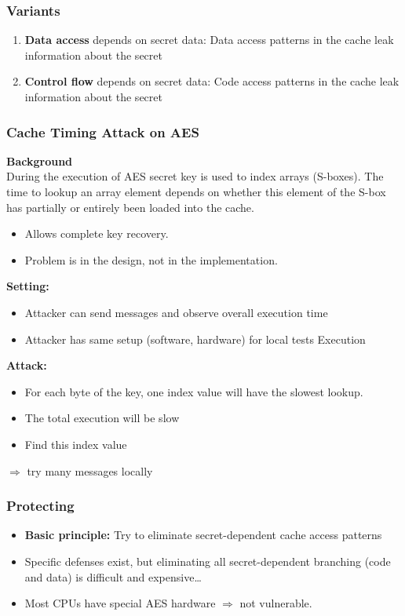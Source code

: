 \subsubsection{Variants}
\begin{enumerate}
  \item \textbf{Data access} depends on secret data: Data access patterns
    in the cache leak information about the secret
  \item \textbf{Control flow} depends on secret data: Code access
    patterns in the cache leak information about the secret
\end{enumerate}
\subsubsection{Cache Timing Attack on AES}
\textbf{Background}\\
During the execution of AES secret key is used to
index arrays (S-boxes). The time to lookup an array element depends
on whether this element of the S-box has partially or entirely been loaded into the
cache.
\begin{itemize}
  \item Allows complete key recovery.
  \item Problem is in the design, not in the implementation.
\end{itemize}

\textbf{Setting:}
\begin{itemize}
  \item Attacker can send messages and observe overall execution time
  \item Attacker has same setup (software, hardware) for local tests
    Execution
\end{itemize}

\textbf{Attack:}
\begin{itemize}
  \item For each byte of the key, one index value will have the slowest lookup.
  \item The total execution will be slow
  \item Find this index value
\end{itemize}
$\Rightarrow$  try many messages locally


\subsubsection{Protecting}
\begin{itemize}
  \item \textbf{Basic principle:}
    Try to eliminate secret-dependent cache access patterns
  \item Specific defenses exist, but eliminating all secret-dependent
    branching (code and data) is difficult and expensive…
  \item Most CPUs have special AES hardware  $\Rightarrow$ not vulnerable.
\end{itemize}

